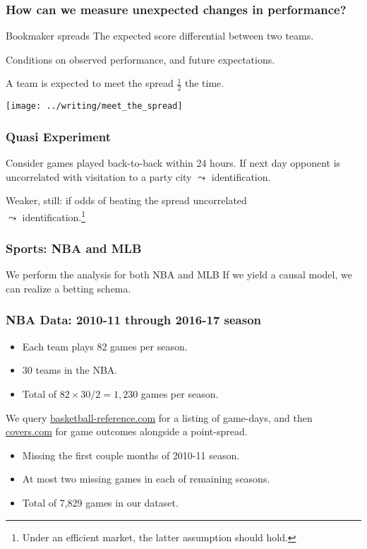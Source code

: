 \documentclass{beamer}
\begin{document}
\begin{frame}
  \frametitle{How can we measure unexpected changes in performance?}   \begin{block}{Bookmaker spreads}     The expected score differential between two teams.

    Conditions on observed performance, and future expectations.

    A team is expected to meet the spread $\frac{1}{2}$ the time.   \end{block} \end{frame}

\begin{frame}
  \centering   \texttt{[image: ../writing/meet\_the\_spread]} \end{frame}

\begin{frame}   \frametitle{Quasi Experiment}
  \begin{block}{Consider games played back-to-back within 24 hours.}     
    If next day opponent is uncorrelated with visitation to a party city $\leadsto$ identification.
    

    Weaker, still: if odds of beating the spread uncorrelated \\
    $\leadsto$ identification.\footnote{Under an efficient market, the latter assumption should hold.}    \end{block}  
\end{frame}

\begin{frame}   \frametitle{Sports: NBA and MLB}
  \begin{block}{We perform the analysis for both NBA and MLB}     If we yield a causal model, we can realize a betting schema.   \end{block} \end{frame}

\begin{frame}   \frametitle{NBA Data: 2010-11 through 2016-17 season}
  \begin{itemize}     \item Each team plays 82 games per season.
    \item 30 teams in the NBA.
    \item Total of $82 \times 30 / 2 = 1,230$ games per season.  
  \end{itemize}

  We query \href{http://www.basketball-reference.com/leagues/}{basketball-reference.com}
  for a listing of game-days, and then 
  \href{http://www.covers.com/sports/NBA/matchups?selectedDate=2011-1-01}{covers.com} for 
  game outcomes alongside a point-spread.

  \begin{itemize}     \item Missing the first couple months of 2010-11 season.
    \item At most two missing games in each of remaining seasons.
    \item Total of 7,829 games in our dataset.   \end{itemize}
\end{frame}
\end{document}

